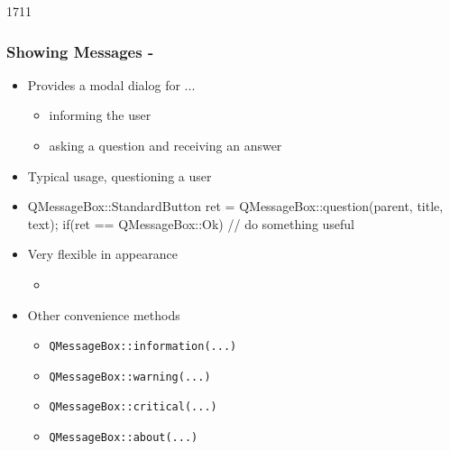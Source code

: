 \begin{slide}[fragile]{1711}
  \frametitle{Showing Messages - }
\begin{itemize}
\item Provides a modal dialog for ...
  \begin{itemize}
  \item informing the user
  \item asking a question and receiving an answer
  \end{itemize}

  \item Typical usage, questioning a user
  \item[]
    \begin{cpp}
QMessageBox::StandardButton ret = 
   QMessageBox::question(parent, title, text);
if(ret == QMessageBox::Ok) {
  // do something useful
}
    \end{cpp}
  \item Very flexible in appearance
    \begin{itemize}
    \item {}
    \end{itemize}

  \item Other convenience methods
    \begin{itemize}
    \item \texttt{QMessageBox::information(...)}
    \item \texttt{QMessageBox::warning(...)}
    \item \texttt{QMessageBox::critical(...)}
    \item \texttt{QMessageBox::about(...)}
   \end{itemize}
 \end{itemize}
\end{slide}


